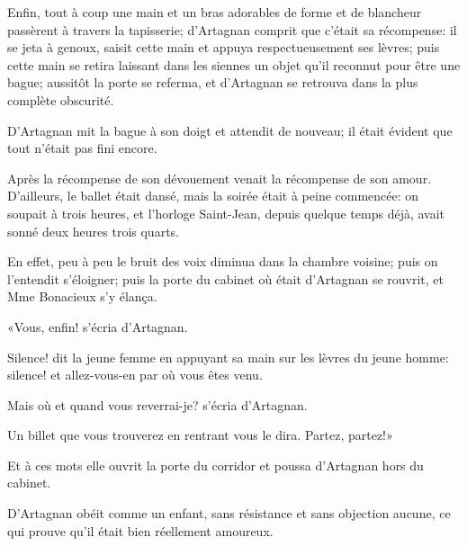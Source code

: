Enfin, tout à coup une main et un bras adorables de forme et de blancheur passèrent à travers la tapisserie; d'Artagnan comprit que c'était sa récompense: il se jeta à genoux, saisit cette main et appuya respectueusement ses lèvres; puis cette main se retira laissant dans les siennes un objet qu'il reconnut pour être une bague; aussitôt la porte se referma, et d'Artagnan se retrouva dans la plus complète obscurité. 

D'Artagnan mit la bague à son doigt et attendit de nouveau; il était évident que tout n'était pas fini encore. 

Après la récompense de son dévouement venait la récompense de son amour. D'ailleurs, le ballet était dansé, mais la soirée était à peine commencée: on soupait à trois heures, et l'horloge Saint-Jean, depuis quelque temps déjà, avait sonné deux heures trois quarts. 

En effet, peu à peu le bruit des voix diminua dans la chambre voisine; puis on l'entendit s'éloigner; puis la porte du cabinet où était d'Artagnan se rouvrit, et Mme Bonacieux s'y élança. 

«Vous, enfin! s'écria d'Artagnan. 

\speak  Silence! dit la jeune femme en appuyant sa main sur les lèvres du jeune homme: silence! et allez-vous-en par où vous êtes venu. 

\speak  Mais où et quand vous reverrai-je? s'écria d'Artagnan. 

\speak  Un billet que vous trouverez en rentrant vous le dira. Partez, partez!» 

Et à ces mots elle ouvrit la porte du corridor et poussa d'Artagnan hors du cabinet. 

D'Artagnan obéit comme un enfant, sans résistance et sans objection aucune, ce qui prouve qu'il était bien réellement amoureux.